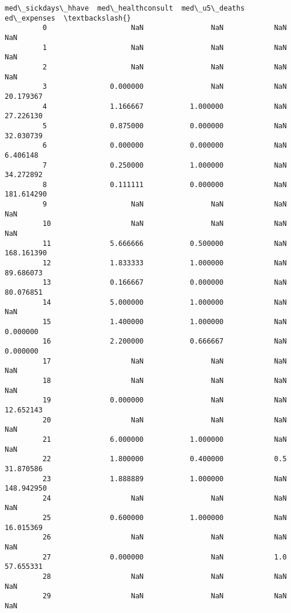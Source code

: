 \documentclass[11pt]{article}
\begin{document}
\begin{Verbatim}[commandchars=\\\{\}]
               med\_sickdays\_hhave  med\_healthconsult  med\_u5\_deaths  ed\_expenses  \textbackslash{}
         0                    NaN                NaN            NaN          NaN   
         1                    NaN                NaN            NaN          NaN   
         2                    NaN                NaN            NaN          NaN   
         3               0.000000                NaN            NaN    20.179367   
         4               1.166667           1.000000            NaN    27.226130   
         5               0.875000           0.000000            NaN    32.030739   
         6               0.000000           0.000000            NaN     6.406148   
         7               0.250000           1.000000            NaN    34.272892   
         8               0.111111           0.000000            NaN   181.614290   
         9                    NaN                NaN            NaN          NaN   
         10                   NaN                NaN            NaN          NaN   
         11              5.666666           0.500000            NaN   168.161390   
         12              1.833333           1.000000            NaN    89.686073   
         13              0.166667           0.000000            NaN    80.076851   
         14              5.000000           1.000000            NaN          NaN   
         15              1.400000           1.000000            NaN     0.000000   
         16              2.200000           0.666667            NaN     0.000000   
         17                   NaN                NaN            NaN          NaN   
         18                   NaN                NaN            NaN          NaN   
         19              0.000000                NaN            NaN    12.652143   
         20                   NaN                NaN            NaN          NaN   
         21              6.000000           1.000000            NaN          NaN   
         22              1.800000           0.400000            0.5    31.870586   
         23              1.888889           1.000000            NaN   148.942950   
         24                   NaN                NaN            NaN          NaN   
         25              0.600000           1.000000            NaN    16.015369   
         26                   NaN                NaN            NaN          NaN   
         27              0.000000                NaN            1.0    57.655331   
         28                   NaN                NaN            NaN          NaN   
         29                   NaN                NaN            NaN          NaN   

\end{Verbatim}
\end{document}
